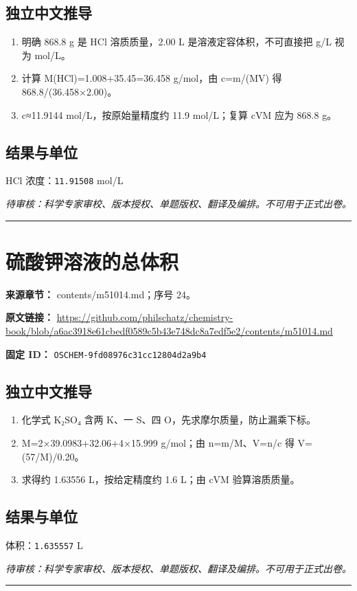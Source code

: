 \documentclass[UTF8,11pt,oneside,openany,fontset=none]{ctexbook}
\begin{document}
\subsection*{独立中文推导}
\begin{enumerate}
\item 明确 868.8 g 是 HCl 溶质质量，2.00 L 是溶液定容体积，不可直接把 g/L 视为 mol/L。
\item 计算 M(HCl)=1.008+35.45=36.458 g/mol，由 c=m/(MV) 得 868.8/(36.458×2.00)。
\item c≈11.9144 mol/L，按原始量精度约 11.9 mol/L；复算 cVM 应为 868.8 g。
\end{enumerate}
\subsection*{结果与单位}
\noindent HCl 浓度：\texttt{11.91508} mol/L\par
\noindent\textit{待审核：科学专家审校、版本授权、单题版权、翻译及编排。不可用于正式出卷。}
\medskip\hrule\medskip
\section{硫酸钾溶液的总体积}
\noindent\textbf{来源章节：} contents/m51014.md；序号 24。\par
\noindent\textbf{原文链接：} \url{https://github.com/philschatz/chemistry-book/blob/a6ac3918e61cbedf0589c5b43e748dc8a7edf5e2/contents/m51014.md}\par
\noindent\textbf{固定 ID：} \texttt{OSCHEM-9fd08976c31cc12804d2a9b4}\par
\subsection*{独立中文推导}
\begin{enumerate}
\item 化学式 K₂SO₄ 含两 K、一 S、四 O，先求摩尔质量，防止漏乘下标。
\item M=2×39.0983+32.06+4×15.999 g/mol；由 n=m/M、V=n/c 得 V=(57/M)/0.20。
\item 求得约 1.63556 L，按给定精度约 1.6 L；由 cVM 验算溶质质量。
\end{enumerate}
\subsection*{结果与单位}
\noindent 体积：\texttt{1.635557} L\par
\noindent\textit{待审核：科学专家审校、版本授权、单题版权、翻译及编排。不可用于正式出卷。}
\medskip\hrule\medskip
\end{document}

